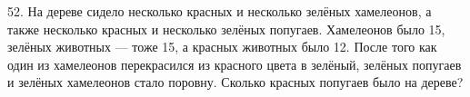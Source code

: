 52. На дереве сидело несколько красных и несколько зелёных хамелеонов, а также несколько красных и несколько зелёных попугаев. Хамелеонов было 15, зелёных животных --- тоже 15, а красных животных было 12. После того как один из хамелеонов перекрасился из красного цвета в зелёный, зелёных попугаев и зелёных хамелеонов стало поровну. Сколько красных попугаев было на дереве?\\
